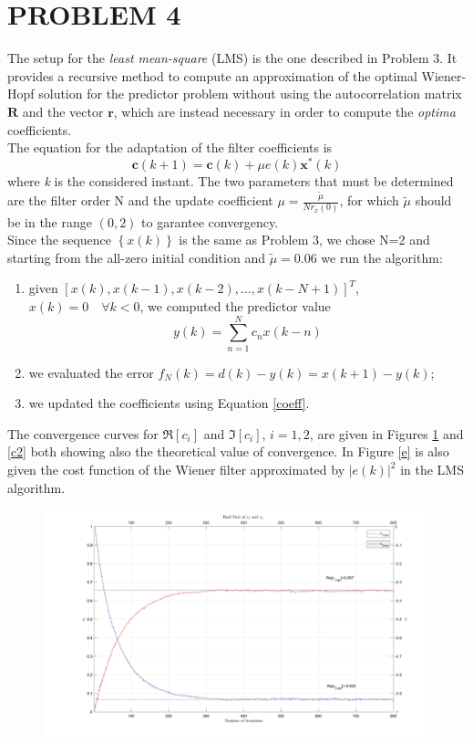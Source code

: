 \documentclass[a4paper,11pt,openright,twoside]{report}
\begin{document}
\clearpage
\section*{PROBLEM 4}
The setup for the \textit{least mean-square} (LMS) is the one described in Problem 3. It provides a recursive method to compute an approximation of the optimal Wiener-Hopf solution for the predictor problem without using the autocorrelation matrix $\mathbf{R}$ and the vector $\mathbf{r}$, which are instead necessary in order to compute the \textit{optima} coefficients. \\
The equation for the adaptation of the filter coefficients is 
\begin{equation}\label{coeff}
\mathbf{c}(k+1) = \mathbf{c}(k)+\mu e(k)\mathbf{x}^*(k)
\end{equation}
where \textit{k} is the considered instant. The two parameters that must be determined are the filter order N and the update coefficient $\mu = \frac{\tilde{\mu}}{Nr_x(0)}$, for which $\tilde{\mu}$ should be in the range $(0,2)$ to garantee convergency. \\
Since the sequence $ \left\lbrace x(k) \right\rbrace$ is the same as Problem 3, we chose N=2 and starting from the all-zero initial condition and $\tilde{\mu}=0.06$ we run the algorithm:
\begin{enumerate}
	\item given $[x(k), x(k-1), x(k-2), \dots, x(k-N+1)]^T $, $x(k)=0 \quad \forall k<0$, we computed the predictor value
	      $$ y(k) = \sum_{n=1}^Nc_nx(k-n) $$
	\item we evaluated the error $ f_N(k) = d(k)-y(k) = x(k+1)-y(k) $; 
	\item we updated the coefficients using Equation \ref{coeff}.
\end{enumerate}

The convergence curves for $\Re[c_i]$ and $\Im[c_i]$, $i=1,2$, are given in Figures \ref{c1} and \ref{c2} both showing also the theoretical value of convergence. In Figure \ref{e} is also given the cost function of the Wiener filter approximated by $|e(k)|^2$ in the LMS algorithm.

\begin{figure}
	\centering
	\includegraphics[width=14cm]{images/c1.jpg}
	\caption{}\label{c1}
\end{figure}
\end{document}
